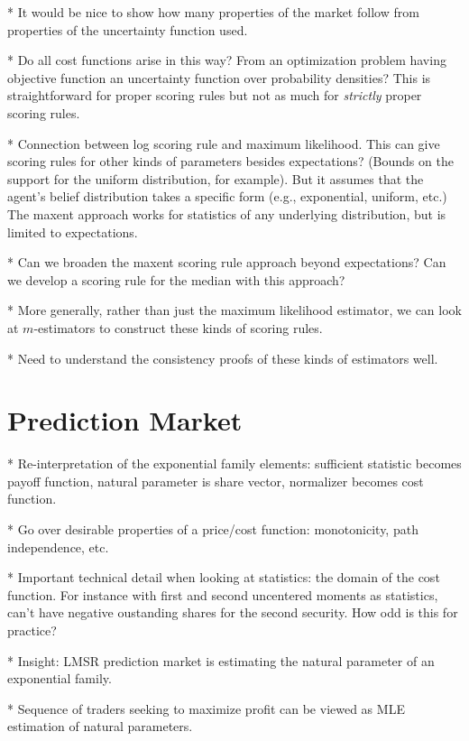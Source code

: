 \documentclass[11pt,letterpaper]{article}
\begin{document}
* It would be nice to show how many properties of the market follow from properties of the uncertainty function used.

* Do all cost functions arise in this way? From an optimization problem having objective function an uncertainty function over probability densities? This is straightforward for proper scoring rules but not as much for \emph{strictly} proper scoring rules.

* Connection between log scoring rule and maximum likelihood. This can give scoring rules for other kinds of parameters besides expectations? (Bounds on the support for the uniform distribution, for example). But it assumes that the agent's belief distribution takes a specific form (e.g., exponential, uniform, etc.) The maxent approach works for statistics of any underlying distribution, but is limited to expectations.

* Can we broaden the maxent scoring rule approach beyond expectations? Can we develop a scoring rule for the median with this approach?

* More generally, rather than just the maximum likelihood estimator, we can look at $m$-estimators to construct these kinds of scoring rules.

* Need to understand the consistency proofs of these kinds of estimators well.



\section{Prediction Market}

* Re-interpretation of the exponential family elements: sufficient statistic becomes payoff function, natural parameter is share vector, normalizer becomes cost function.

* Go over desirable properties of a price/cost function: monotonicity, path independence, etc.

* Important technical detail when looking at statistics: the domain of the cost function. For instance with first and second uncentered moments as statistics, can't have negative oustanding shares for the second security. How odd is this for practice?

* Insight: LMSR prediction market is estimating the natural parameter of an exponential family.

* Sequence of traders seeking to maximize profit can be viewed as MLE estimation of natural parameters.
\end{document}
